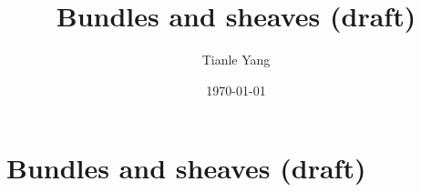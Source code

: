 \documentclass{noteformyself}
\title{Bundles and sheaves (draft)}
\author{Tianle Yang}
\date{\today}
\begin{document}
    \maketitle
    \section{Bundles and sheaves (draft)}




\end{document}
